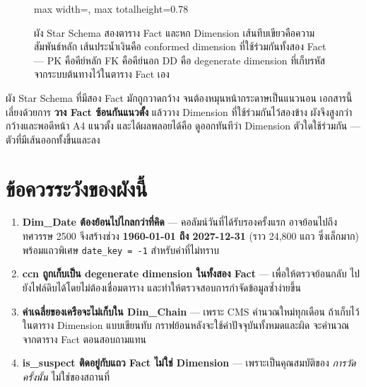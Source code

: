 \documentclass[11pt,a4paper]{article}
\newcommand{\code}[1]{\texttt{#1}}
\begin{document}
\begin{figure}[H]
\begin{adjustbox}{max width=\linewidth, max totalheight=0.78\textheight}
\end{adjustbox}
\caption{ผัง Star Schema สองตาราง Fact และหก Dimension เส้นทึบเขียวคือความสัมพันธ์หลัก เส้นประน้ำเงินคือ conformed dimension ที่ใช้ร่วมกันทั้งสอง Fact --- PK คือคีย์หลัก FK คือคีย์นอก DD คือ degenerate dimension ที่เก็บรหัสจากระบบต้นทางไว้ในตาราง Fact เอง}
\end{figure}


\clearpage
\begin{keybox}[title={ทำไมวางผังแบบนี้}]
ผัง Star Schema ที่มีสอง Fact มักถูกวาดกว้าง จนต้องหมุนหน้ากระดาษเป็นแนวนอน
เอกสารนี้เลี่ยงด้วยการ \textbf{วาง Fact ซ้อนกันแนวตั้ง} แล้ววาง Dimension
ที่ใช้ร่วมกันไว้สองข้าง ผังจึงสูงกว่ากว้างและพอดีหน้า A4 แนวตั้ง
และได้ผลพลอยได้คือ ดูออกทันทีว่า Dimension ตัวใดใช้ร่วมกัน --- ตัวที่มีเส้นออกทั้งขึ้นและลง
\end{keybox}

\section{ข้อควรระวังของผังนี้}

\begin{enumerate}
\item \textbf{Dim\_Date ต้องย้อนไปไกลกว่าที่คิด} --- คอลัมน์วันที่ได้รับรองครั้งแรก
      อาจย้อนไปถึงทศวรรษ 2500 จึงสร้างช่วง \textbf{1960-01-01 ถึง 2027-12-31}
      (ราว 24{,}800 แถว ซึ่งเล็กมาก) พร้อมแถวพิเศษ \code{date_key = -1} สำหรับค่าที่ไม่ทราบ
\item \textbf{ccn ถูกเก็บเป็น degenerate dimension ในทั้งสอง Fact} --- เพื่อให้ตรวจย้อนกลับ
      ไปยังไฟล์ดิบได้โดยไม่ต้องเชื่อมตาราง และทำให้ตรวจสอบการกำจัดข้อมูลซ้ำง่ายขึ้น
\item \textbf{ค่าเฉลี่ยของเครือจะไม่เก็บใน Dim\_Chain} --- เพราะ CMS คำนวณใหม่ทุกเดือน
      ถ้าเก็บไว้ในตาราง Dimension แบบเขียนทับ กราฟย้อนหลังจะใช้ค่าปัจจุบันทั้งหมดและผิด
      จะคำนวณจากตาราง Fact ตอนสอบถามแทน
\item \textbf{is\_suspect ติดอยู่กับแถว Fact ไม่ใช่ Dimension} --- เพราะเป็นคุณสมบัติของ
      \emph{การวัดครั้งนั้น} ไม่ใช่ของสถานที่
\end{enumerate}
\end{document}
